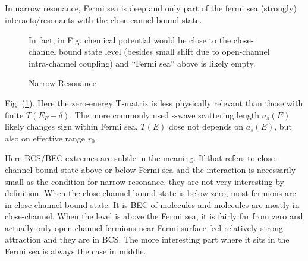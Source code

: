 \subsection{}
In narrow resonance, Fermi sea is deep and only part of the fermi sea (strongly) interacts/resonants with the close-cannel bound-state.   
\begin{figure}[hhtb]
	\centering
	         \quad
		\quad
	{\caption{Narrow Resonance\label{fig:narrowFR}}
	\parbox{0.7\textwidth}{\small{In fact, in Fig.  chemical potential would be close to the close-channel bound state level (besides small shift due to open-channel intra-channel coupling) and ``Fermi sea'' above is likely empty. }}}
\end{figure}
Fig. (\ref{fig:narrowFR}).  Here the zero-energy T-matrix is less  physically relevant than those with finite $T(E_{F}-\delta)$.  The more commonly used s-wave scattering length $a_{s}(E)$ likely changes sign within Fermi sea.  $T(E)$ dose not depends on $a_{s}(E)$, but also on effective range $r_{0}$.  

Here BCS/BEC extremes are subtle in the meaning.  If that refers to close-channel bound-state above or below Fermi sea and the interaction is necessarily small as the condition for narrow resonance, they are not very interesting by definition.  When the close-channel bound-state is below zero, most fermions are in close-channel bound-state.  It is BEC of molecules and molecules are mostly in close-channel. When the level is above the Fermi sea, it is fairly far from zero and actually only open-channel fermions near Fermi surface feel relatively strong attraction and they are in BCS.  The more interesting part where it sits in the Fermi sea is always the  case in middle.  

